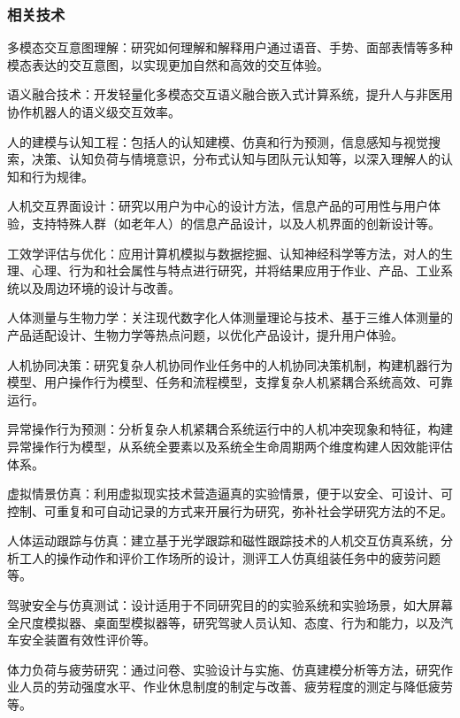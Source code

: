 \subsubsection{相关技术}


多模态交互意图理解：研究如何理解和解释用户通过语音、手势、面部表情等多种模态表达的交互意图，以实现更加自然和高效的交互体验。

语义融合技术：开发轻量化多模态交互语义融合嵌入式计算系统，提升人与非医用协作机器人的语义级交互效率。

人的建模与认知工程：包括人的认知建模、仿真和行为预测，信息感知与视觉搜索，决策、认知负荷与情境意识，分布式认知与团队元认知等，以深入理解人的认知和行为规律。

人机交互界面设计：研究以用户为中心的设计方法，信息产品的可用性与用户体验，支持特殊人群（如老年人）的信息产品设计，以及人机界面的创新设计等。

工效学评估与优化：应用计算机模拟与数据挖掘、认知神经科学等方法，对人的生理、心理、行为和社会属性与特点进行研究，并将结果应用于作业、产品、工业系统以及周边环境的设计与改善。

人体测量与生物力学：关注现代数字化人体测量理论与技术、基于三维人体测量的产品适配设计、生物力学等热点问题，以优化产品设计，提升用户体验。

人机协同决策：研究复杂人机协同作业任务中的人机协同决策机制，构建机器行为模型、用户操作行为模型、任务和流程模型，支撑复杂人机紧耦合系统高效、可靠运行。

异常操作行为预测：分析复杂人机紧耦合系统运行中的人机冲突现象和特征，构建异常操作行为模型，从系统全要素以及系统全生命周期两个维度构建人因效能评估体系。

虚拟情景仿真：利用虚拟现实技术营造逼真的实验情景，便于以安全、可设计、可控制、可重复和可自动记录的方式来开展行为研究，弥补社会学研究方法的不足。

人体运动跟踪与仿真：建立基于光学跟踪和磁性跟踪技术的人机交互仿真系统，分析工人的操作动作和评价工作场所的设计，测评工人仿真组装任务中的疲劳问题等。

驾驶安全与仿真测试：设计适用于不同研究目的的实验系统和实验场景，如大屏幕全尺度模拟器、桌面型模拟器等，研究驾驶人员认知、态度、行为和能力，以及汽车安全装置有效性评价等。

体力负荷与疲劳研究：通过问卷、实验设计与实施、仿真建模分析等方法，研究作业人员的劳动强度水平、作业休息制度的制定与改善、疲劳程度的测定与降低疲劳等。

